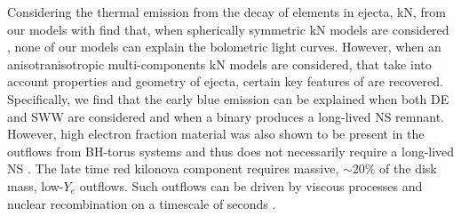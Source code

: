 Considering the thermal emission from the decay of \rproc{} elements in ejecta, \ac{kN}, 
from our models with find that, when spherically symmetric \ac{kN} models are 
considered \citep{Villar:2017wcc}, none of our models can explain 
the \AT{} bolometric light curves.
However, when an anisotranisotropic multi-components \ac{kN} models are considered, 
that take into account properties and geometry of ejecta, 
certain key features of \AT{} are recovered.
Specifically, we find that the early blue emission can be explained 
when both \ac{DE} and \ac{SWW} are considered and when a binary produces 
a long-lived \ac{NS} remnant.
However, high electron fraction material was also shown to be present in the outflows 
from \ac{BH}-torus systems and thus does not necessarily require a long-lived \ac{NS} 
\citep{Fujibayashi:2020qda}.
The late time red kilonova component requires massive, ${\sim}20\%$ of the disk mass, 
low-$Y_e$ outflows. Such outflows can be driven by viscous processes and nuclear recombination 
on a timescale of seconds \citep[\eg][]{Metzger:2008av}.
%

